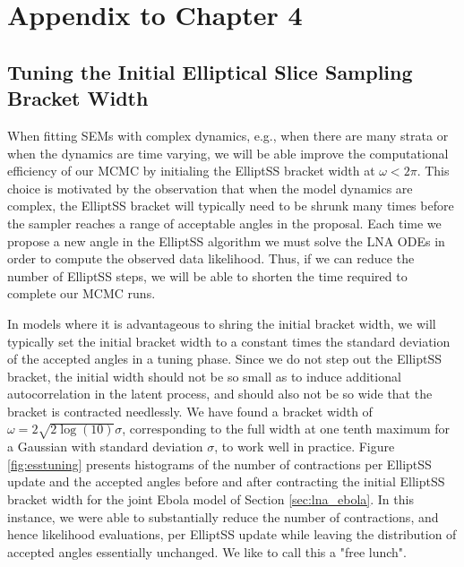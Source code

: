 \chapter{Appendix to Chapter 4}
\label{chap:appendix_ch4}

\section{Tuning the Initial Elliptical Slice Sampling Bracket Width}
\label{sec:lna_init_bracket_width}

When fitting SEMs with complex dynamics, e.g., when there are many strata or when the dynamics are time varying, we will be able improve the computational efficiency of our MCMC by initialing the ElliptSS bracket width at $ \omega < 2\pi $. This choice is motivated by the observation that when the model dynamics are complex, the ElliptSS bracket will typically need to be shrunk many times before the sampler reaches a range of acceptable angles in the proposal. Each time we propose a new angle in the ElliptSS algorithm we must solve the LNA ODEs in order to compute the observed data likelihood. Thus, if we can reduce the number of ElliptSS steps, we will be able to shorten the time required to complete our MCMC runs. 

In models where it is advantageous to shring the initial bracket width, we will typically set the initial bracket width to a constant times the standard deviation of the accepted angles in a tuning phase. Since we do not step out the ElliptSS bracket, the initial width should not be so small as to induce additional autocorrelation in the latent process, and should also not be so wide that the bracket is contracted needlessly. We have found a bracket width of $ \omega = 2\sqrt{2\log(10)}\sigma $, corresponding to the full width at one tenth maximum for a Gaussian with standard deviation $ \sigma $, to work well in practice. Figure \ref{fig:esstuning} presents histograms of the number of contractions per ElliptSS update and the accepted angles before and after contracting the initial ElliptSS bracket width for the joint Ebola model of Section \ref{sec:lna_ebola}. In this instance, we were able to substantially reduce the number of contractions, and hence likelihood evaluations, per ElliptSS update while leaving the distribution of accepted angles essentially unchanged. We like to call this a "free lunch".

